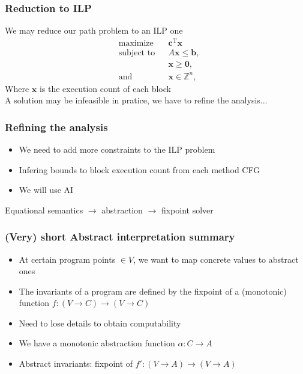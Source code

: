 \documentclass{beamer}
\begin{document}
\begin{frame}
    \frametitle{Reduction to ILP}
    We may reduce our path problem to an ILP one \pause
    \begin{align*}
        & \text{maximize}   && \mathbf{c}^\mathrm{T} \mathbf{x}\\
        & \text{subject to} && A \mathbf{x} \le \mathbf{b}, \\
        &  && \mathbf{x} \ge \mathbf{0}, \\
        & \text{and} && \mathbf{x} \in \mathbb{Z}^n,
        \end{align*}
    Where $\mathbf x$ is the execution count of each block\\ \pause 
    A solution may be infeasible in pratice, we have to refine the analysis...
\end{frame}

\begin{frame}
    \frametitle{Refining the analysis}
    \pause 
    \begin{itemize}
        \item We need to add more constraints to the ILP problem \pause 
        \item Infering bounds to block execution count from each method CFG \pause 
        \item We will use AI \pause 
    \end{itemize}
    \break
    \break
    Equational semantics \pause $\rightarrow$ abstraction \pause $\rightarrow$ fixpoint solver 
\end{frame}

\begin{frame}
    \frametitle{(Very) short Abstract interpretation summary}
    \pause 
    \begin{itemize}
        \item At certain program points $\in V$, we want to map concrete values to abstract ones \pause
        \item The invariants of a program are defined by the fixpoint of a (monotonic) function $f: (V \rightarrow  C) \rightarrow (V \rightarrow  C)$ \pause 
        \item Need to lose details to obtain computability \pause
        \item We have a monotonic abstraction function $\alpha : C \rightarrow A$ \pause 
        \item Abstract invariants: fixpoint of $f': (V \rightarrow  A) \rightarrow (V \rightarrow  A)$ \pause 
    \end{itemize}
\end{frame}
\end{document}
